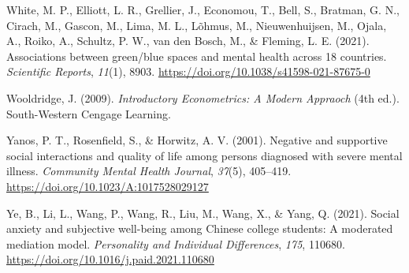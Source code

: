 \documentclass[
  letterpaper,
  number,
  review,
  3p]{elsarticle}
\newlength{\cslhangindent}
\newenvironment{CSLReferences}[2] %
 {\begin{list}{}{%
  \setlength{\itemindent}{0pt}
  \setlength{\leftmargin}{0pt}
  \setlength{\parsep}{0pt}
  \ifodd #1
   \setlength{\leftmargin}{\cslhangindent}
   \setlength{\itemindent}{-1\cslhangindent}
  \fi
  \setlength{\itemsep}{#2\baselineskip}}}
 {\end{list}}
\begin{document}
\begin{CSLReferences}{1}{0}
White, M. P., Elliott, L. R., Grellier, J., Economou, T., Bell, S.,
Bratman, G. N., Cirach, M., Gascon, M., Lima, M. L., Lõhmus, M.,
Nieuwenhuijsen, M., Ojala, A., Roiko, A., Schultz, P. W., van den Bosch,
M., \& Fleming, L. E. (2021). Associations between green/blue spaces and
mental health across 18 countries. \emph{Scientific Reports},
\emph{11}(1), 8903. \url{https://doi.org/10.1038/s41598-021-87675-0}

Wooldridge, J. (2009). \emph{Introductory {Econometrics}: {A Modern
Appraoch}} (4th ed.). South-Western Cengage Learning.

Yanos, P. T., Rosenfield, S., \& Horwitz, A. V. (2001). Negative and
supportive social interactions and quality of life among persons
diagnosed with severe mental illness. \emph{Community Mental Health
Journal}, \emph{37}(5), 405--419.
\url{https://doi.org/10.1023/A:1017528029127}

Ye, B., Li, L., Wang, P., Wang, R., Liu, M., Wang, X., \& Yang, Q.
(2021). Social anxiety and subjective well-being among {Chinese} college
students: {A} moderated mediation model. \emph{Personality and
Individual Differences}, \emph{175}, 110680.
\url{https://doi.org/10.1016/j.paid.2021.110680}

\end{CSLReferences}
\end{document}
